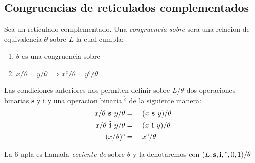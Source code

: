   \subsection{Congruencias de reticulados complementados}
  \begin{definition}
    Sea \reticulCompl un reticulado complementado. Una \emph{congruencia sobre} \reticulCompl sera una
    relacion de equivalencia $\theta$ sobre $L$ la cual cumpla: 
    \begin{enumerate}
      \item $\theta$ es una congruencia sobre \reticulAcot
      \item $x/\theta = y/\theta \implies x^c/\theta = y^c/\theta$
    \end{enumerate}

    Las condiciones anteriores nos permiten definir sobre $L/\theta$ dos operaciones binarias $\tilde{\textbf{s}}$ y $\tilde{\text{i}}$
    y una operacion binaria ${}^{\tilde{c}}$ de la siguiente manera:
    \begin{alignat*}{3}
      x/\theta\tilde{\textbf{ s }}y/\theta &=&\ & (x\textbf{ s }y)/\theta\\
      x/\theta\tilde{\textbf{ i }}y/\theta &=&\ & (x\textbf{ i }y)/\theta\\
      (x/\theta)^{\tilde{c}} &=&\ & x^c/\theta
    \end{alignat*}

    La 6-upla  es llamada
    \emph{cociente de} \reticulCompl sobre $\theta$ y la denotaremos con $(L, \textbf{s}, \textbf{i}, {}^c, 0, 1)/\theta$
  \end{definition}

